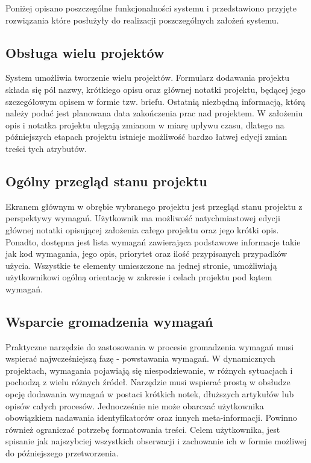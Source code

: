     Poniżej opisano poszczególne funkcjonalności systemu i przedstawiono przyjęte rozwiązania które posłużyły do realizacji poszczególnych założeń systemu.

    \subsection{Obsługa wielu projektów} 
      System umożliwia tworzenie wielu projektów. Formularz dodawania projektu składa się pól nazwy, krótkiego opisu oraz głównej notatki projektu, będącej jego szczegółowym opisem w formie tzw. briefu. Ostatnią niezbędną informacją, którą należy podać jest planowana data zakończenia prac nad projektem. W założeniu opis i notatka projektu ulegają zmianom w miarę upływu czasu, dlatego na późniejszych etapach projektu istnieje możliwość bardzo łatwej edycji zmian treści tych atrybutów. 

    \subsection{Ogólny przegląd stanu projektu}
      Ekranem głównym w obrębie wybranego projektu jest przegląd stanu projektu z perspektywy wymagań. Użytkownik ma możliwość natychmiastowej edycji głównej notatki opisującej założenia całego projektu oraz jego krótki opis. Ponadto, dostępna jest lista wymagań zawierająca podstawowe informacje takie jak kod wymagania, jego opis, priorytet oraz ilość przypisanych przypadków użycia. Wszystkie te elementy umieszczone na jednej stronie, umożliwiają użytkownikowi ogólną orientację w zakresie i celach projektu pod kątem wymagań. 

    \subsection{Wsparcie gromadzenia wymagań}
      Praktyczne narzędzie do zastosowania w procesie gromadzenia wymagań musi wspierać najwcześniejszą fazę - powstawania wymagań. W dynamicznych projektach, wymagania pojawiają się niespodziewanie, w różnych sytuacjach i pochodzą z wielu różnych źródeł. Narzędzie musi wspierać prostą w obsłudze opcję dodawania wymagań w postaci krótkich notek, dłuższych artykułów lub opisów całych procesów. Jednocześnie nie może obarczać użytkownika obowiązkiem nadawania identyfikatorów oraz innych meta-informacji. Powinno również ograniczać potrzebę formatowania treści. Celem użytkownika, jest spisanie jak najszybciej wszystkich obserwacji i zachowanie ich w formie możliwej do późniejszego przetworzenia.

